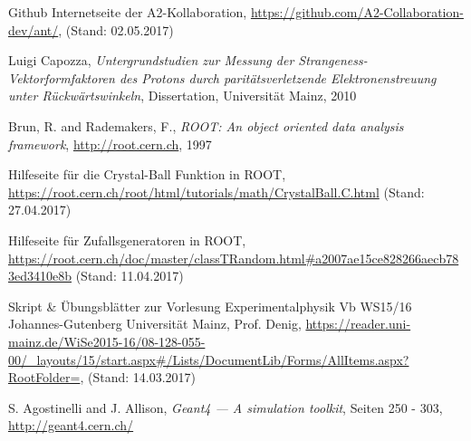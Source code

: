 \documentclass[a4paper,11pt,oneside,final,german,openbib,pdftex]{scrbook}
\begin{document}
{\begin{appendix}






\renewcommand{\bibname}{\bfont Literaturverzeichnis} 

\begin{thebibliography}{99}
 Github Internetseite der A2-Kollaboration, \url{https://github.com/A2-Collaboration-dev/ant/}, (Stand: 02.05.2017)

 Luigi Capozza, {\em Untergrundstudien zur Messung der
	Strangeness-Vektorformfaktoren
	des Protons durch parit\"atsverletzende
	Elektronenstreuung unter R\"uckw\"artswinkeln}, Dissertation, Universität Mainz, 2010 


 Brun, R. and Rademakers, F., \textit{ROOT: An object oriented data analysis framework}, \url{http://root.cern.ch}, 1997 

 Hilfeseite für die Crystal-Ball Funktion in ROOT, \url{https://root.cern.ch/root/html/tutorials/math/CrystalBall.C.html} (Stand: 27.04.2017)

 Hilfeseite f\"ur Zufallsgeneratoren in ROOT, \url{https://root.cern.ch/doc/master/classTRandom.html#a2007ae15ce828266aecb783ed3410e8b} (Stand: 11.04.2017)


 Skript \& Übungsblätter zur Vorlesung Experimentalphysik Vb WS15/16 Johannes-Gutenberg Universit\"at Mainz, Prof. Denig, \url{https://reader.uni-mainz.de/WiSe2015-16/08-128-055-00/_layouts/15/start.aspx#/Lists/DocumentLib/Forms/AllItems.aspx?RootFolder=}, (Stand: 14.03.2017)

 S. Agostinelli and J. Allison, \textit{Geant4 — A simulation toolkit}, Seiten 250 - 303, \url{http://geant4.cern.ch/}



\end{thebibliography}
\end{appendix}}
\end{document}
